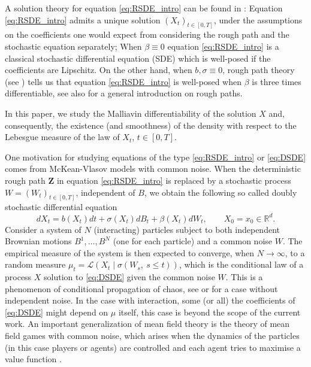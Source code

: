 \documentclass[11pt,a4paper]{article}
\newcommand{\R}{\mathbb{R}}
\theoremstyle{plain}
\begin{document}
A solution theory for equation \eqref{eq:RSDE_intro} can be found in \cite{FHL21}: Equation \eqref{eq:RSDE_intro} admits a unique solution $(X_t)_{t\in[0,T]}$, under the assumptions on the coefficients one would expect from considering the rough path and the stochastic equation separately; 
When $\beta\equiv 0$ equation \eqref{eq:RSDE_intro} is a classical stochastic differential equation (SDE) which is well-posed if the coefficients are Lipschitz. On the other hand, when $b,\sigma \equiv 0$, rough path theory (see \cite{Lyo98}) tells us that equation \eqref{eq:RSDE_intro} is well-posed when $\beta$ is three times differentiable, see also \cite{FH20} for a general introduction on rough paths.


In this paper, we study the Malliavin differentiability of the solution $X$ and, consequently, the existence (and smoothness) of the density with respect to the Lebesgue measure of the law of $X_t$, $t\in[0,T]$. 


One motivation for studying equations of the type \eqref{eq:RSDE_intro} or \eqref{eq:DSDE} comes from McKean-Vlasov models with common noise. 
When the deterministic rough path $\mathbf{Z}$ in equation \eqref{eq:RSDE_intro} is replaced by a stochastic process $W=(W_t)_{t\in[0,T]}$, independent of $B$, we obtain the following so called doubly stochastic differential equation
\begin{equation} \label{eq:DSDE}
dX_t=b(X_t)dt+\sigma(X_t)dB_t+\beta(X_t)dW_t, \qquad X_0 = x_0 \in \R^d.
\end{equation} 
Consider a system of $N$ (interacting) particles subject to both independent Brownian motions $B^1, \dots, B^N$ (one for each particle) and a common noise $W$. The empirical measure of the system is then expected to converge,  when $N\to \infty$, to a random measure \linebreak $\mu_t = \mathcal{L}(X_t\mid\sigma(W_s, \ s\leq t))$, which is the conditional law of a process $X$ solution to \eqref{eq:DSDE} given the common noise $W$. This is a phenomenon of conditional propagation of chaos, see \cite{kurtz1999particle} or \cite{coghi2016propagation} for a case without independent noise. In the case with interaction, some (or all) the coefficients of \eqref{eq:DSDE} might depend on $\mu$ itself, this case is beyond the scope of the current work. An important generalization of mean field theory is the theory of mean field games with common noise, which arises when the dynamics of the particles (in this case players or agents) are controlled and each agent tries to maximise a value function \cite{CARMONADELARUE_volumeII}. 
\end{document}
